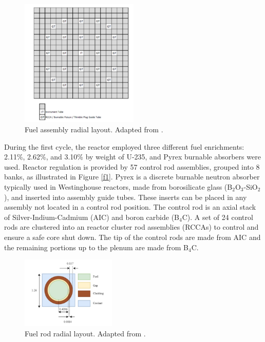 \begin{figure}
    \centering
    \includegraphics[width=0.5\textwidth]{figs/asm.png}
    \caption[Fuel assembly radial layout.]{Fuel assembly radial layout. Adapted from \cite{albagami}.}
    \label{f3}
\end{figure}

During the first cycle, the reactor employed three different fuel enrichments: 2.11\%, 2.62\%, and 3.10\% by weight of U-235, and Pyrex burnable absorbers were used. Reactor regulation is provided by 57 control rod assemblies, grouped into 8 banks, as illustrated in Figure \ref{f1}. Pyrex is a discrete burnable neutron absorber typically used in Westinghouse reactors, made from borosilicate glass (B$_2$O$_3$-SiO$_2$), and inserted into assembly guide tubes. These inserts can be placed in any assembly not located in a control rod position. The control rod is an axial stack of Silver-Indium-Cadmium (AIC) and boron carbide (B$_4$C). A set of 24 control rods are clustered into an reactor cluster rod assemblies (RCCAs) to control and ensure a safe core shut down. The tip of the control rods are made from AIC and the remaining portions up to the plenum are made from B$_4$C. 

\begin{figure}
    \centering
    \includegraphics[width=0.4\textwidth]{figs/pin.png}
    \caption[Fuel rod radial layout.]{Fuel rod radial layout. Adapted from \cite{albagami}.}
    \label{f2}
\end{figure}

